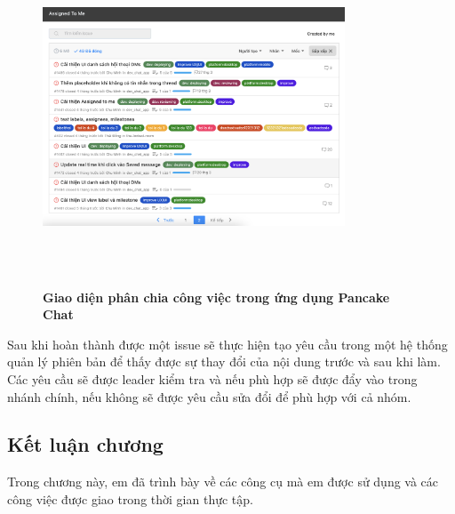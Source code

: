 \begin{figure}[H]
  \centering
  \includegraphics[width=9cm,height=10cm]{Images/pancake/panchat_issue.png}
  \caption[Giao diện phân chia công việc trong ứng dụng Pancake Chat]{\bfseries \fontsize{12pt}{0pt}
  \selectfont Giao diện phân chia công việc trong ứng dụng Pancake Chat}
  \label{panchat_issue} 
\end{figure}

Sau khi hoàn thành được một issue sẽ thực hiện tạo yêu cầu trong một hệ thống quản lý phiên bản để
thấy được sự thay đổi của nội dung trước và sau khi làm. Các yêu cầu sẽ được leader kiểm tra và nếu phù hợp sẽ
được đẩy vào trong nhánh chính, nếu không sẽ được yêu cầu sửa đổi để phù hợp với cả nhóm.

\subsection{Kết luận chương}
Trong chương này, em đã trình bày về các công cụ mà em được sử dụng và các công việc được giao trong thời gian
thực tập.
\newpage